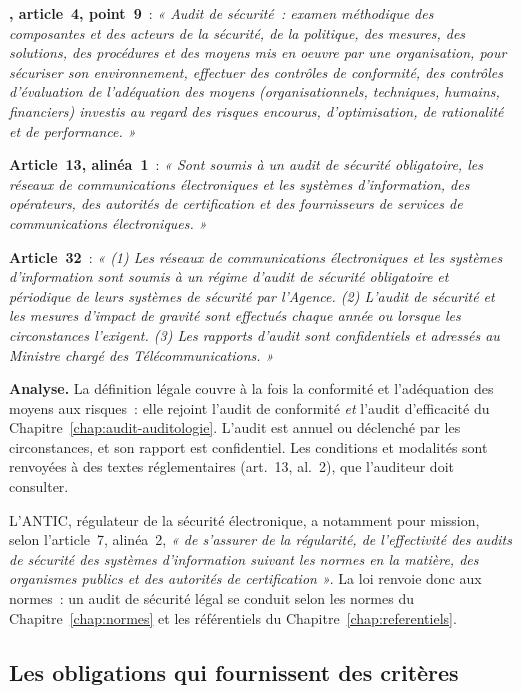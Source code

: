 \begin{boxjuris}
\textbf{, article~4, point~9}~: \textit{« Audit de
sécurité~: examen méthodique des composantes et des acteurs de la sécurité,
de la politique, des mesures, des solutions, des procédures et des moyens
mis en oeuvre par une organisation, pour sécuriser son environnement,
effectuer des contrôles de conformité, des contrôles d'évaluation de
l'adéquation des moyens (organisationnels, techniques, humains,
financiers) investis au regard des risques encourus, d'optimisation, de
rationalité et de performance. »}

\medskip
\textbf{Article~13, alinéa~1}~: \textit{« Sont soumis à un audit de sécurité
obligatoire, les réseaux de communications électroniques et les systèmes
d'information, des opérateurs, des autorités de certification et des
fournisseurs de services de communications électroniques. »}

\medskip
\textbf{Article~32}~: \textit{« (1) Les réseaux de communications
électroniques et les systèmes d'information sont soumis à un régime
d'audit de sécurité obligatoire et périodique de leurs systèmes de
sécurité par l'Agence. (2) L'audit de sécurité et les mesures d'impact de
gravité sont effectués chaque année ou lorsque les circonstances
l'exigent. (3) Les rapports d'audit sont confidentiels et adressés au
Ministre chargé des Télécommunications. »}

\medskip
\textbf{Analyse.} La définition légale couvre à la fois la conformité et
l'adéquation des moyens aux risques~: elle rejoint l'audit de conformité
\emph{et} l'audit d'efficacité du Chapitre~\ref{chap:audit-auditologie}.
L'audit est annuel ou déclenché par les circonstances, et son rapport est
confidentiel. Les conditions et modalités sont renvoyées à des textes
réglementaires (art.~13, al.~2), que l'auditeur doit consulter.
\end{boxjuris}

L'ANTIC, régulateur de la sécurité électronique, a notamment pour mission,
selon l'article~7, alinéa~2, \textit{« de s'assurer de la régularité, de
l'effectivité des audits de sécurité des systèmes d'information suivant
les normes en la matière, des organismes publics et des autorités de
certification »}. La loi renvoie donc aux normes~: un audit de sécurité
légal se conduit selon les normes du Chapitre~\ref{chap:normes} et les
référentiels du Chapitre~\ref{chap:referentiels}.

\subsection{Les obligations qui fournissent des critères}


